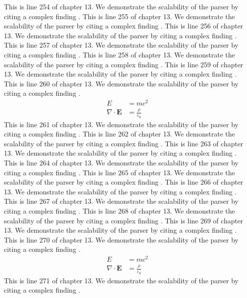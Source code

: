 This is line 254 of chapter 13. We demonstrate the scalability of the parser by citing a complex finding \cite{ref13_254}.
This is line 255 of chapter 13. We demonstrate the scalability of the parser by citing a complex finding \cite{ref13_255}.
This is line 256 of chapter 13. We demonstrate the scalability of the parser by citing a complex finding \cite{ref13_256}.
This is line 257 of chapter 13. We demonstrate the scalability of the parser by citing a complex finding \cite{ref13_257}.
This is line 258 of chapter 13. We demonstrate the scalability of the parser by citing a complex finding \cite{ref13_258}.
This is line 259 of chapter 13. We demonstrate the scalability of the parser by citing a complex finding \cite{ref13_259}.
This is line 260 of chapter 13. We demonstrate the scalability of the parser by citing a complex finding \cite{ref13_260}.
\begin{align*}
  E &= mc^2 \\
  \nabla \cdot \mathbf{E} &= \frac{\rho}{\varepsilon_0}
\end{align*}
This is line 261 of chapter 13. We demonstrate the scalability of the parser by citing a complex finding \cite{ref13_261}.
This is line 262 of chapter 13. We demonstrate the scalability of the parser by citing a complex finding \cite{ref13_262}.
This is line 263 of chapter 13. We demonstrate the scalability of the parser by citing a complex finding \cite{ref13_263}.
This is line 264 of chapter 13. We demonstrate the scalability of the parser by citing a complex finding \cite{ref13_264}.
This is line 265 of chapter 13. We demonstrate the scalability of the parser by citing a complex finding \cite{ref13_265}.
This is line 266 of chapter 13. We demonstrate the scalability of the parser by citing a complex finding \cite{ref13_266}.
This is line 267 of chapter 13. We demonstrate the scalability of the parser by citing a complex finding \cite{ref13_267}.
This is line 268 of chapter 13. We demonstrate the scalability of the parser by citing a complex finding \cite{ref13_268}.
This is line 269 of chapter 13. We demonstrate the scalability of the parser by citing a complex finding \cite{ref13_269}.
This is line 270 of chapter 13. We demonstrate the scalability of the parser by citing a complex finding \cite{ref13_270}.
\begin{align*}
  E &= mc^2 \\
  \nabla \cdot \mathbf{E} &= \frac{\rho}{\varepsilon_0}
\end{align*}
This is line 271 of chapter 13. We demonstrate the scalability of the parser by citing a complex finding \cite{ref13_271}.
